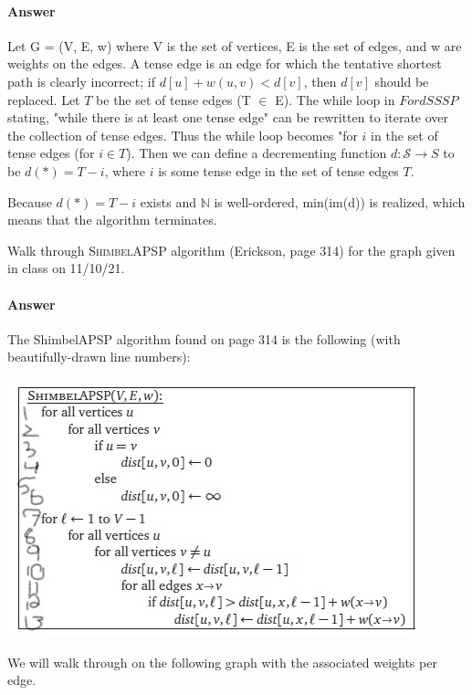\documentclass{article}
\begin{document}
\paragraph{Answer}
Let G = (V, E, w) where V is the set of vertices, E is the set of edges, and w are weights on the edges. A tense edge is an edge for which the tentative shortest path is clearly incorrect; if $d[u]+w(u,v) < d[v]$, then $d[v]$ should be replaced. Let $T$ be the set of tense edges (T $\in$ E). The while loop in $FordSSSP$ stating, "while there is at least one tense edge" can be rewritten to iterate over the collection of tense edges. Thus the while loop becomes "for $i$ in the set of tense edges (for $i \in T$). Then we can define a decrementing function $d : \mathcal{S} \rightarrow S$ to be $d(*) = T - i$, where $i$ is some tense edge in the set of tense edges $T$. 

Because $d(*) = T - i$ exists and $\mathbb{N}$ is well-ordered, min(im(d)) is realized, which means that the algorithm terminates.


Walk through \textsc{ShimbelAPSP} algorithm (Erickson, page 314) for the graph given in class on
11/10/21.

\paragraph{Answer}

The ShimbelAPSP algorithm found on page 314 is the following (with beautifully-drawn line numbers): 

\includegraphics[scale=0.5]{shimbelapsp.jpg}

We will walk through on the following graph with the associated weights per edge.
\end{document}
